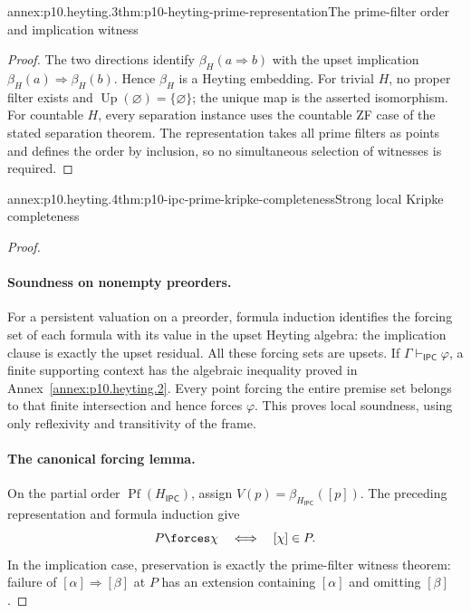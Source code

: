 \begin{annexitem}{annex:p10.heyting.3}{thm:p10-heyting-prime-representation}{The prime-filter order and implication witness}
\begin{proof}
The two directions identify \(\beta_H(a\Rightarrow b)\)
with the upset implication
\(\beta_H(a)\Rightarrow\beta_H(b)\).
Hence \(\beta_H\) is a Heyting embedding.
For trivial \(H\), no proper filter exists and
\(\operatorname{Up}(\varnothing)=\{\varnothing\}\);
the unique map is the asserted isomorphism.
For countable \(H\), every separation instance uses the
countable ZF case of the stated separation theorem.
The representation takes all prime filters as points and
defines the order by inclusion, so no simultaneous selection
of witnesses is required.
\end{proof}
\end{annexitem}

\begin{annexitem}{annex:p10.heyting.4}{thm:p10-ipc-prime-kripke-completeness}{Strong local Kripke completeness}
\begin{proof}
\paragraph{Soundness on nonempty preorders.}
For a persistent valuation on a preorder, formula induction
identifies the forcing set of each formula with its value in
the upset Heyting algebra:
the implication clause is exactly the upset residual.
All these forcing sets are upsets.
If \(\Gamma\vdash_{\mathsf{IPC}}\varphi\), a finite
supporting context has the algebraic inequality proved in
Annex~\ref{annex:p10.heyting.2}.
Every point forcing the entire premise set belongs to that
finite intersection and hence forces \(\varphi\).
This proves local soundness, using only reflexivity and
transitivity of the frame.

\paragraph{The canonical forcing lemma.}
On the partial order
\(\operatorname{Pf}(H_{\mathsf{IPC}})\), assign
\(V(p)=\beta_{H_{\mathsf{IPC}}}([p])\).
The preceding representation and formula induction give
\[
 P\forces\chi\quad\Longleftrightarrow\quad[\chi]\in P.
\]
In the implication case, preservation is exactly the
prime-filter witness theorem:
failure of \([\alpha]\Rightarrow[\beta]\) at \(P\)
has an extension containing \([\alpha]\) and omitting
\([\beta]\).


\end{proof}
\end{annexitem}
